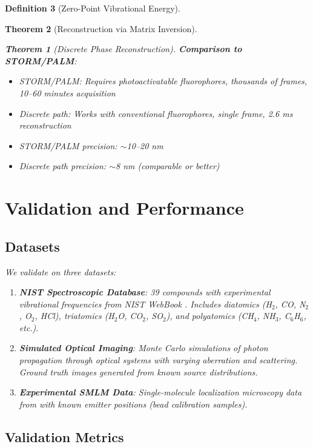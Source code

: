 \documentclass[11pt,a4paper]{article}
\newtheorem{theorem}{Theorem}[section]
\theoremstyle{definition}
\newtheorem{definition}[theorem]{Definition}
\theoremstyle{remark}
\begin{document}
\begin{definition}[Zero-Point Vibrational Energy]
\begin{theorem}[Reconstruction via Matrix Inversion]
\begin{theorem}[Discrete Phase Reconstruction]
\textbf{Comparison to STORM/PALM}:
\begin{itemize}
\item STORM/PALM: Requires photoactivatable fluorophores, thousands of frames, 10--60 minutes acquisition
\item Discrete path: Works with conventional fluorophores, single frame, 2.6 ms reconstruction
\item STORM/PALM precision: $\sim$10--20 nm
\item Discrete path precision: $\sim$8 nm (comparable or better)
\end{itemize}

\section{Validation and Performance}
\label{sec:validation}

\subsection{Datasets}

We validate on three datasets:

\begin{enumerate}
\item \textbf{NIST Spectroscopic Database}: 39 compounds with experimental vibrational frequencies from NIST WebBook \cite{nist_webbook}. Includes diatomics (H$_2$, CO, N$_2$, O$_2$, HCl), triatomics (H$_2$O, CO$_2$, SO$_2$), and polyatomics (CH$_4$, NH$_3$, C$_6$H$_6$, etc.).

\item \textbf{Simulated Optical Imaging}: Monte Carlo simulations of photon propagation through optical systems with varying aberration and scattering. Ground truth images generated from known source distributions.

\item \textbf{Experimental SMLM Data}: Single-molecule localization microscopy data from \cite{sage2019super} with known emitter positions (bead calibration samples).
\end{enumerate}

\subsection{Validation Metrics}


\end{theorem}
\end{theorem}
\end{definition}
\end{document}
